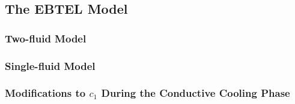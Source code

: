 
\subsection{The EBTEL Model}\label{sec:ebtel}


\subsubsection{Two-fluid Model}\label{sec:ebtel-two-fluid}


\subsubsection{Single-fluid Model}\label{sec:ebtel-single-fluid}


\subsubsection{Modifications to $c_1$ During the Conductive Cooling Phase}\label{sec:c1-correction}

